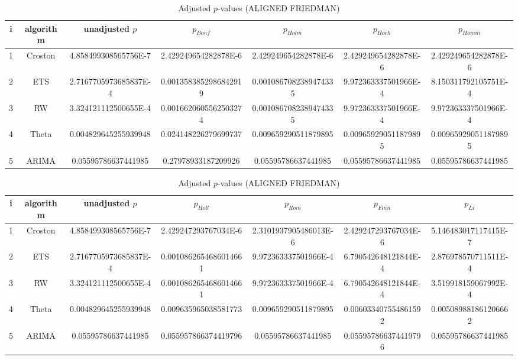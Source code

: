 \documentclass[a4paper,10pt]{article}
\begin{document}
\begin{landscape}
\begin{table}[!htp]
\centering\scriptsize
\caption{Adjusted $p$-values (ALIGNED FRIEDMAN)}
\begin{tabular}{ccccccc}
i&algorithm&unadjusted $p$&$p_{Bonf}$&$p_{Holm}$&$p_{Hoch}$&$p_{Homm}$\\
\hline
1&Croston&4.858499308565756E-7&2.429249654282878E-6&2.429249654282878E-6&2.429249654282878E-6&2.429249654282878E-6\\
2&ETS&2.7167705973685837E-4&0.0013583852986842919&0.0010867082389474335&9.972363337501966E-4&8.150311792105751E-4\\
3&RW&3.324121112500655E-4&0.0016620605562503274&0.0010867082389474335&9.972363337501966E-4&9.972363337501966E-4\\
4&Theta&0.004829645255939948&0.024148226279699737&0.009659290511879895&0.009659290511879895&0.009659290511879895\\
5&ARIMA&0.05595786637441985&0.27978933187209926&0.05595786637441985&0.05595786637441985&0.05595786637441985\\
\hline
\end{tabular}
\end{table}

\begin{table}[!htp]
\centering\scriptsize
\caption{Adjusted $p$-values (ALIGNED FRIEDMAN)}
\begin{tabular}{ccccccc}
i&algorithm&unadjusted $p$&$p_{Holl}$&$p_{Rom}$&$p_{Finn}$&$p_{Li}$\\
\hline
1&Croston&4.858499308565756E-7&2.429247293767034E-6&2.3101937905486013E-6&2.429247293767034E-6&5.146483017117415E-7\\
2&ETS&2.7167705973685837E-4&0.0010862654686014661&9.972363337501966E-4&6.790542648121844E-4&2.876978570711511E-4\\
3&RW&3.324121112500655E-4&0.0010862654686014661&9.972363337501966E-4&6.790542648121844E-4&3.519918159067992E-4\\
4&Theta&0.004829645255939948&0.009635965038581773&0.009659290511879895&0.006033407554861592&0.005089881861206662\\
5&ARIMA&0.05595786637441985&0.055957866374419796&0.05595786637441985&0.055957866374419796&0.05595786637441985\\
\hline
\end{tabular}
\end{table}


\newpage


\end{landscape}
\end{document}
